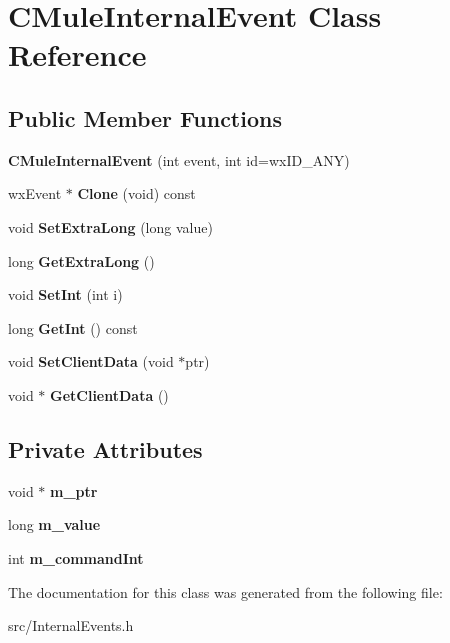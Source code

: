 \section{CMuleInternalEvent Class Reference}
\label{classCMuleInternalEvent}
\subsection*{Public Member Functions}
\begin{DoxyCompactItemize}
\item 
{\bfseries CMuleInternalEvent} (int event, int id=wxID\_\-ANY)\label{classCMuleInternalEvent_ae6aa18a513ffa4807b68d1fc7168e628}

\item 
wxEvent $\ast$ {\bfseries Clone} (void) const \label{classCMuleInternalEvent_a56ad2d08cc46fafe531af3875672393a}

\item 
void {\bfseries SetExtraLong} (long value)\label{classCMuleInternalEvent_aa3cf7f58f6dfea40bf537da9083acd94}

\item 
long {\bfseries GetExtraLong} ()\label{classCMuleInternalEvent_a6174ff8e7d9c53db8e32a7562b4bf6b3}

\item 
void {\bfseries SetInt} (int i)\label{classCMuleInternalEvent_a99792320184ee0f68b930630d4105e0f}

\item 
long {\bfseries GetInt} () const \label{classCMuleInternalEvent_a1647fa2f6a5a1de2505b95af7822e28c}

\item 
void {\bfseries SetClientData} (void $\ast$ptr)\label{classCMuleInternalEvent_a939bca5bcc9195fd1a6fb6f1714a7e44}

\item 
void $\ast$ {\bfseries GetClientData} ()\label{classCMuleInternalEvent_a4e4b5e1b6fd413919bd34cc65a89fae3}

\end{DoxyCompactItemize}
\subsection*{Private Attributes}
\begin{DoxyCompactItemize}
\item 
void $\ast$ {\bfseries m\_\-ptr}\label{classCMuleInternalEvent_aa6070571581f2f6ccac8fbb9dcf3763c}

\item 
long {\bfseries m\_\-value}\label{classCMuleInternalEvent_ad00c5e0ba64ff1422be503d73c5cf85a}

\item 
int {\bfseries m\_\-commandInt}\label{classCMuleInternalEvent_a29d24722339e516de04c0bad64fe64e4}

\end{DoxyCompactItemize}


The documentation for this class was generated from the following file:\begin{DoxyCompactItemize}
\item 
src/InternalEvents.h\end{DoxyCompactItemize}
